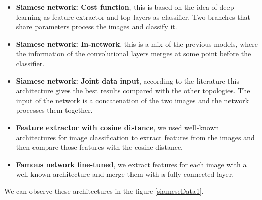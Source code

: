 \begin{itemize}


\item \textbf{Siamese network: Cost function}, this is based on the idea of deep learning as feature extractor and top layers as classifier. Two branches that share parameters process the images and classify it.

\item \textbf{Siamese network: In-network}, this is a mix of the previous models, where the information of the convolutional layers merges at some point before the classifier.

\item \textbf{Siamese network: Joint data input}, according to the literature this architecture gives the best results compared with the other topologies. The input of the network is a concatenation of the two images and the network processes them together.


\item \textbf{Feature extractor with cosine distance}, we used well-known architectures for image classification to extract features from the images and then compare those features with the cosine distance.

\item \textbf{Famous network fine-tuned}, we extract features for each image with a well-known architecture and merge them  with a fully connected layer.

\end{itemize}

We can observe these architectures in the figure \ref{siameseData1}.

